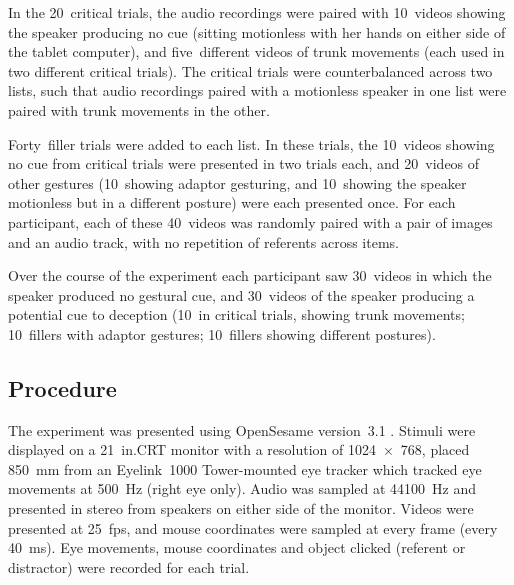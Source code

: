 \documentclass[a4paper,man,natbib]{apa6}
\begin{document}
In the 20~critical trials, the audio recordings were paired with 10~videos showing the speaker producing no cue (sitting motionless with her hands on either side of the tablet computer), and five~different videos of trunk movements (each used in two different critical trials).
The critical trials were counterbalanced across two lists, such that audio recordings paired with a motionless speaker in one list were paired with trunk movements in the other.

Forty~filler trials were added to each list.  In these trials, the 10~videos showing no cue from critical trials were presented in two trials each, and 20~videos of other gestures (10~showing adaptor gesturing, and 10~showing the speaker motionless but in a different posture) were each presented once.
For each participant, each of these 40~videos was randomly paired with a pair of images and an audio track, with no repetition of referents across items.

Over the course of the experiment each participant saw 30~videos in which the speaker produced no gestural cue, and 30~videos of the speaker producing a potential cue to deception (10~in critical trials, showing trunk movements; 10~fillers with adaptor gestures; 10~fillers showing different postures).

\subsection{Procedure}
The experiment was presented using OpenSesame version~3.1 \citep{Mathot2012}.
Stimuli were displayed on a 21~in.\@ CRT monitor with a resolution of 1024~$\times$~768, placed 850~mm from an Eyelink~1000 Tower-mounted eye tracker which tracked eye movements at 500~Hz (right eye only). 
Audio was sampled at 44100~Hz and presented in stereo from speakers on either side of the monitor. 
Videos were presented at 25~fps, and mouse coordinates were sampled at every frame (every 40~ms).
Eye movements, mouse coordinates and object clicked (referent or distractor) were recorded for each trial.
\end{document}
